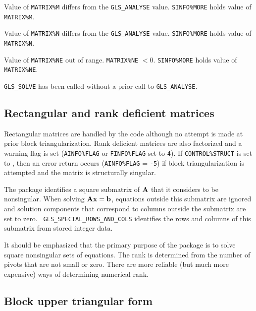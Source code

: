 \documentclass{galahad}
\newcommand{\packagename}{GLS}
\begin{document}
\begin{description}

  Value of {\tt MATRIX\%M} differs from the {\tt \packagename\_ANALYSE}
value. {\tt SINFO\%MORE} holds value of {\tt MATRIX\%M}.

  Value of {\tt MATRIX\%N} differs from the {\tt \packagename\_ANALYSE}
value. {\tt SINFO\%MORE} holds value of {\tt MATRIX\%N}.

  Value of {\tt MATRIX\%NE} out of range.  {\tt MATRIX\%NE} $<0$.
{\tt SINFO\%MORE} holds value of {\tt MATRIX\%NE}.

 {\tt \packagename\_SOLVE} has been called without a prior call to
 {\tt \packagename\_ANALYSE}.

\end{description}

\subsection{Rectangular and rank deficient matrices}

Rectangular matrices are handled by the code although no attempt is made
at prior block triangularization.  Rank deficient matrices are also factorized
and a warning flag is set ({\tt AINFO\%FLAG} or {\tt FINFO\%FLAG} set to
{\tt 4}).
If {\tt CONTROL\%STRUCT} is set to \true,
then an error return occurs ({\tt AINFO\%FLAG} = {\tt -5}) if block
triangularization is attempted and the matrix is structurally singular.

 The package identifies a square submatrix of ${\mathbf{A}}$ that it considers
to be nonsingular. When solving ${\mathbf{A}} {\mathbf{x}} = {\mathbf{b}}$, equations outside
this submatrix are ignored and solution components that correspond to
columns outside the submatrix are set to zero. {\tt
\packagename\_SPECIAL\_ROWS\_AND\_COLS} identifies the rows and columns
of this submatrix from stored integer data.

It should be emphasized that the primary purpose of the
package is to solve square nonsingular sets of equations. The
rank is determined from the number of pivots that are not small or zero.
There are more reliable (but much more expensive) ways of determining
numerical rank.

\subsection{Block upper triangular form} \label{secbtf}
\end{document}
